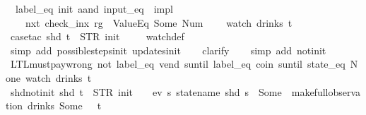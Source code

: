 \begin{isabellebody}
{\ \ {\isachardoublequoteopen}{\isacharparenleft}{\isacharparenleft}label_eq\ {\isacharprime}{\isacharprime}init{\isacharprime}{\isacharprime}\ aand\ input_eq\ {\isacharbrackleft}{\isacharbrackright}{\isacharparenright}\ impl\isanewline
\ \ \ \ {\isacharparenleft}nxt\ {\isacharparenleft}check_inx\ rg\ {}\ ValueEq\ {\isacharparenleft}Some\ {\isacharparenleft}Num\ {}{\isacharparenright}{\isacharparenright}{\isacharparenright}{\isacharparenright}{\isacharparenright}\isanewline
\ \ \ {\isacharparenleft}watch\ drinks\ t{\isacharparenright}{\isachardoublequoteclose}%
}%
%
\isadelimproof
\ \ %
\endisadelimproof
%
\isatagproof
{}\isamarkupfalse%
\ {\isacharparenleft}case{\isacharunderscore}tac\ {\isachardoublequoteopen}shd\ t\ {\isacharequal}\ {\isacharparenleft}STR\ {\isacharprime}{\isacharprime}init{\isacharprime}{\isacharprime}{\isacharcomma}\ {\isacharbrackleft}{\isacharbrackright}{\isacharparenright}{\isachardoublequoteclose}{\isacharparenright}\isanewline
\ \ \isamarkupfalse%
\ watch{\isacharunderscore}def\isanewline
\ \ \ \isamarkupfalse%
\ {\isacharparenleft}simp\ add{\isacharcolon}\ possible{\isacharunderscore}steps{\isacharunderscore}init\ updates{\isacharunderscore}init{\isacharparenright}\isanewline
\ \ \isamarkupfalse%
\ clarify\isanewline
\ \ \isamarkupfalse%
\ {\isacharparenleft}simp\ add{\isacharcolon}\ not{\isacharunderscore}init{\isacharparenright}%
\endisatagproof
{\isafoldproof}%
%
\isadelimproof
%
\endisadelimproof
\isanewline
\isanewline
\isanewline
{}\isamarkupfalse%
\ LTL{\isacharunderscore}must{\isacharunderscore}pay{\isacharunderscore}wrong{\isacharcolon}\ {\isachardoublequoteopen}{\isacharparenleft}{\isacharparenleft}not\ {\isacharparenleft}label_eq\ {\isacharprime}{\isacharprime}vend{\isacharprime}{\isacharprime}\ suntil\ label_eq\ {\isacharprime}{\isacharprime}coin{\isacharprime}{\isacharprime}{\isacharparenright}{\isacharparenright}\ suntil\ state_eq\ None{\isacharparenright}\ {\isacharparenleft}watch\ drinks\ t{\isacharparenright}{\isachardoublequoteclose}\isanewline
%
\isadelimproof
\ \ %
\endisadelimproof
%
\isatagproof
{}\isamarkupfalse%
%
\endisatagproof
{\isafoldproof}%
%
\isadelimproof
\isanewline
%
\endisadelimproof
\isanewline
{}\isamarkupfalse%
\ shd{\isacharunderscore}not{\isacharunderscore}init{\isacharcolon}\ {\isachardoublequoteopen}shd\ t\ {\isasymnoteq}\ {\isacharparenleft}STR\ {\isacharprime}{\isacharprime}init{\isacharprime}{\isacharprime}{\isacharcomma}\ {\isacharbrackleft}{\isacharbrackright}{\isacharparenright}\ {\isasymLongrightarrow}\ {\isasymnot}\ ev\ {\isacharparenleft}{\isasymlambda}s{\isachardot}\ statename\ {\isacharparenleft}shd\ s{\isacharparenright}\ {\isacharequal}\ Some\ {}{\isacharparenright}\ {\isacharparenleft}make{\isacharunderscore}full{\isacharunderscore}observation\ drinks\ {\isacharparenleft}Some\ {}{\isacharparenright}\ {\isacharless}{\isachargreater}\ t{\isacharparenright}{\isachardoublequoteclose}\isanewline

\end{isabellebody}
